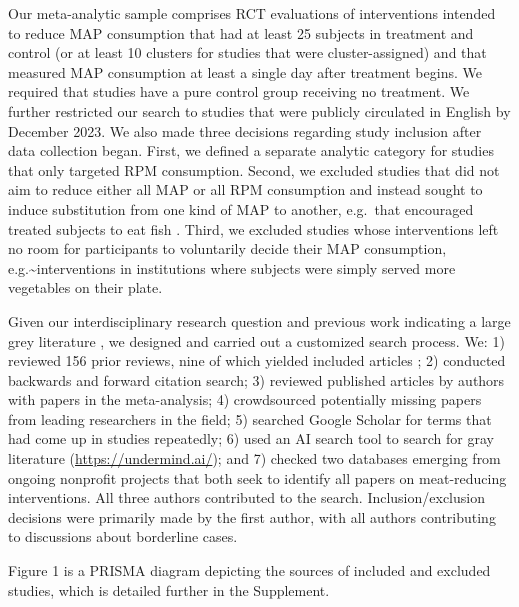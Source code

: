 \documentclass[preprint, 3p,
authoryear]{elsarticle} %
\begin{document}
Our meta-analytic sample comprises RCT evaluations of interventions
intended to reduce MAP consumption that had at least 25 subjects in
treatment and control (or at least 10 clusters for studies that were
cluster-assigned) and that measured MAP consumption at least a single
day after treatment begins. We required that studies have a pure control
group receiving no treatment. We further restricted our search to
studies that were publicly circulated in English by December 2023. We
also made three decisions regarding study inclusion after data
collection began. First, we defined a separate analytic category for
studies that only targeted RPM consumption. Second, we excluded studies
that did not aim to reduce either all MAP or all RPM consumption and
instead sought to induce substitution from one kind of MAP to another,
e.g.~that encouraged treated subjects to eat fish \citep{johansen2009}.
Third, we excluded studies whose interventions left no room for
participants to voluntarily decide their MAP consumption,
e.g.\textasciitilde interventions in institutions where subjects were
simply served more vegetables on their plate.

Given our interdisciplinary research question and previous work
indicating a large grey literature \citep{mathur2021meta}, we designed
and carried out a customized search process. We: 1) reviewed 156 prior
reviews, nine of which yielded included articles
\citep{mathur2021meta, bianchi2018conscious, bianchi2018restructuring, ammann2023, chang2023, DiGennaro2024, harguess2020, ronto2022, wynes2018};
2) conducted backwards and forward citation search; 3) reviewed
published articles by authors with papers in the meta-analysis; 4)
crowdsourced potentially missing papers from leading researchers in the
field; 5) searched Google Scholar for terms that had come up in studies
repeatedly; 6) used an AI search tool to search for gray literature
(\url{https://undermind.ai/}); and 7) checked two databases emerging
from ongoing nonprofit projects that both seek to identify all papers on
meat-reducing interventions. All three authors contributed to the
search. Inclusion/exclusion decisions were primarily made by the first
author, with all authors contributing to discussions about borderline
cases.

Figure 1 is a PRISMA diagram depicting the sources of included and
excluded studies, which is detailed further in the Supplement.
\end{document}
